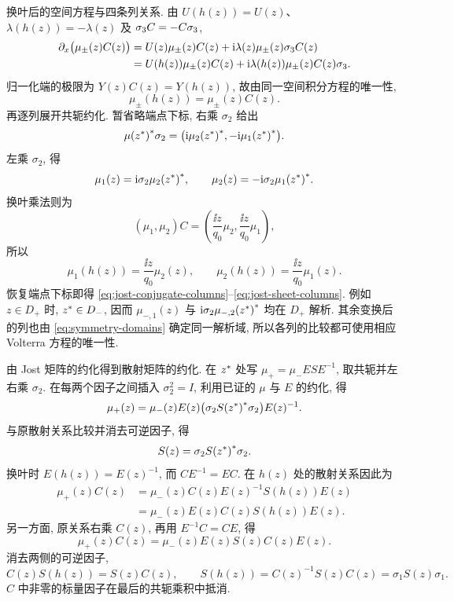 \par\medskip\noindent 换叶后的空间方程与四条列关系.\quad
由 $U(h(z))=U(z)$、$\lambda(h(z))=-\lambda(z)$ 及 $\sigma_3 C=-C\sigma_3$,
\begin{align*}
\partial_x\bigl(\mu_\pm(z)C(z)\bigr)
&=U(z)\mu_\pm(z)C(z)+\mathrm{i}\lambda(z)\mu_\pm(z)\sigma_3 C(z)\\
&=U(h(z))\mu_\pm(z)C(z)
+\mathrm{i}\lambda(h(z))\mu_\pm(z)C(z)\sigma_3.
\end{align*}
归一化端的极限为 $Y(z)C(z)=Y(h(z))$, 故由同一空间积分方程的唯一性,
\begin{equation*}
\mu_\pm(h(z))=\mu_\pm(z)C(z).
\end{equation*}
再逐列展开共轭约化. 暂省略端点下标, 右乘 $\sigma_2$ 给出
\begin{equation*}
{\mu({z}^{*})}^{*}\sigma_2
=\bigl(\mathrm{i}{\mu_2({z}^{*})}^{*},
-\mathrm{i}{\mu_1({z}^{*})}^{*}\bigr).
\end{equation*}
左乘 $\sigma_2$, 得
\begin{equation*}
\mu_1(z)=\mathrm{i}\sigma_2{\mu_2({z}^{*})}^{*},
\qquad
\mu_2(z)=-\mathrm{i}\sigma_2{\mu_1({z}^{*})}^{*}.
\end{equation*}
换叶乘法则为
\begin{equation*}
(\mu_1,\mu_2)C
=\left(\dfrac{\ii z}{q_0}\mu_2,
\dfrac{\ii z}{q_0}\mu_1\right),
\end{equation*}
所以
\begin{equation*}
\mu_1(h(z))=\dfrac{\ii z}{q_0}\mu_2(z),
\qquad
\mu_2(h(z))=\dfrac{\ii z}{q_0}\mu_1(z).
\end{equation*}
恢复端点下标即得 \eqref{eq:jost-conjugate-columns}--\eqref{eq:jost-sheet-columns}.
例如 $z\in D_+$ 时, ${z}^{*}\in D_-$, 因而
$\mu_{-,1}(z)$ 与 $\mathrm{i}\sigma_2{\mu_{-,2}({z}^{*})}^{*}$
均在 $D_+$ 解析. 其余变换后的列也由
\eqref{eq:symmetry-domains} 确定同一解析域,
所以各列的比较都可使用相应 Volterra 方程的唯一性.

\par\medskip\noindent 由 Jost 矩阵的约化得到散射矩阵的约化.\quad
在 ${z}^{*}$ 处写 $\mu_+=\mu_-ESE^{-1}$, 取共轭并左右乘 $\sigma_2$.
在每两个因子之间插入 $\sigma_2^2=I$, 利用已证的 $\mu$ 与 $E$ 的约化, 得
\begin{equation*}
\mu_+(z)=\mu_-(z)E(z)
\bigl(\sigma_2{S({z}^{*})}^{*}\sigma_2\bigr)E(z)^{-1}.
\end{equation*}
与原散射关系比较并消去可逆因子, 得
\begin{equation*}
S(z)=\sigma_2{S({z}^{*})}^{*}\sigma_2.
\end{equation*}
换叶时 $E(h(z))=E(z)^{-1}$, 而 $C E^{-1}=EC$.
在 $h(z)$ 处的散射关系因此为
\begin{align*}
\mu_+(z)C(z)
&=\mu_-(z)C(z)E(z)^{-1}S(h(z))E(z)\\
&=\mu_-(z)E(z)C(z)S(h(z))E(z).
\end{align*}
另一方面, 原关系右乘 $C(z)$, 再用 $E^{-1}C=CE$, 得
\begin{equation*}
\mu_+(z)C(z)=\mu_-(z)E(z)S(z)C(z)E(z).
\end{equation*}
消去两侧的可逆因子,
\begin{equation*}
C(z)S(h(z))=S(z)C(z),
\qquad
S(h(z))=C(z)^{-1}S(z)C(z)=\sigma_1S(z)\sigma_1.
\end{equation*}
$C$ 中非零的标量因子在最后的共轭乘积中抵消.

